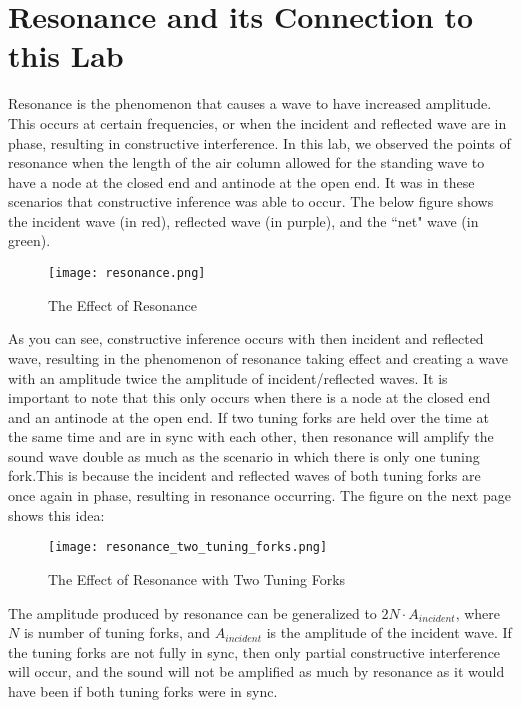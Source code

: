 \documentclass[11pt,twoside]{article}
\begin{document}
\section{Resonance and its Connection to this Lab}

Resonance is the phenomenon that causes a wave to have increased amplitude. This occurs at certain frequencies, or when the incident and reflected wave are in phase, resulting in constructive interference. In this lab, we observed the points of resonance when the length of the air column allowed for the standing wave to have a node at the closed end and antinode at the open end. It was in these scenarios that constructive inference was able to occur. The below figure shows the incident wave (in red), reflected wave (in purple), and the ``net" wave (in green).


\begin{wrapfigure}{l}{0.4\textwidth}
    \centering
    \texttt{[image: resonance.png]}
    \caption{The Effect of Resonance}
\end{wrapfigure}

As you can see, constructive inference occurs with then incident and reflected wave, resulting in the phenomenon of resonance taking effect and creating a wave with an amplitude twice the amplitude of incident/reflected waves. It is important to note that this only occurs when there is a node at the closed end and an antinode at the open end. If two tuning forks are held over the time at the same time and are in sync with each other, then resonance will amplify the sound wave double as much as the scenario in which there is only one tuning fork.This is because the incident and reflected waves of both tuning forks are once again in phase, resulting in resonance occurring. The figure on the next page shows this idea:

\clearpage 

\begin{figure}
    \centering
    \texttt{[image: resonance\_two\_tuning\_forks.png]}
    \caption{The Effect of Resonance with Two Tuning Forks}
\end{figure} 

The amplitude produced by resonance can be generalized to $2N \cdot A_{incident}$, where $N$ is number of tuning forks, and $A_{incident}$ is the amplitude of the incident wave. If the tuning forks are not fully in sync, then only partial constructive interference will occur, and the sound will not be amplified as much by resonance as it would have been if both tuning forks were in sync.
\end{document}
